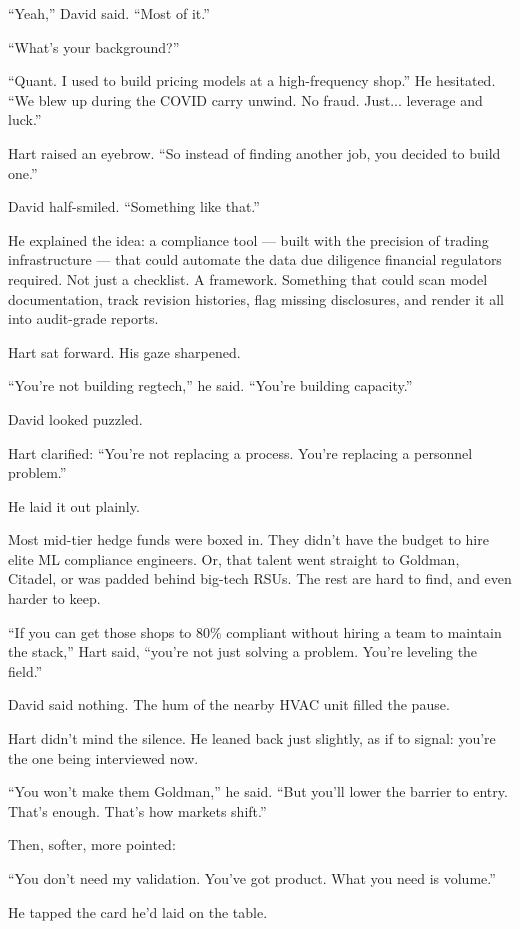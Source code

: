 ``Yeah,'' David said. ``Most of it.''

``What’s your background?''

``Quant. I used to build pricing models at a high-frequency shop.'' 
He hesitated. ``We blew up during the COVID carry unwind. No fraud. Just... leverage and luck.''

Hart raised an eyebrow. ``So instead of finding another job, you decided to build one.''

David half-smiled. ``Something like that.''

He explained the idea: a compliance tool --- built with the precision of trading infrastructure --- that could 
automate the data due diligence financial regulators required.  
Not just a checklist. A framework. Something that could scan model documentation, track revision histories, flag 
missing disclosures, and render it all into audit-grade reports.

Hart sat forward. His gaze sharpened.

``You’re not building regtech,'' he said. ``You’re building capacity.''

David looked puzzled.

Hart clarified: ``You’re not replacing a process. You’re replacing a personnel problem.''

He laid it out plainly. 

Most mid-tier hedge funds were boxed in. They didn’t have the budget to hire elite ML compliance engineers. 
Or, that talent went straight to Goldman, Citadel, or was padded behind big-tech RSUs. 
The rest are hard to find, and even harder to keep.

``If you can get those shops to 80\% compliant without hiring a team to maintain the stack,'' Hart said, ``you’re not 
just solving a problem. You’re leveling the field.''

David said nothing. The hum of the nearby HVAC unit filled the pause.

Hart didn’t mind the silence. He leaned back just slightly, as if to signal: you’re the one being interviewed now.

``You won’t make them Goldman,'' he said. ``But you’ll lower the barrier to entry. That’s enough. That’s how markets shift.''

Then, softer, more pointed:

``You don’t need my validation. You’ve got product. What you need is volume.''

He tapped the card he’d laid on the table.

